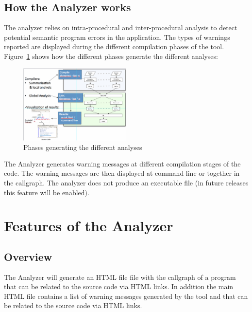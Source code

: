 \subsection{How the \openshmem Analyzer works}

The \openshmem analyzer relies on intra-procedural and inter-procedural
analysis to detect potential semantic program errors in the
application. The types of warnings reported are displayed during the
different compilation phases of the tool. Figure~\ref{fig:phases} shows
how the different phases generate the different analyses:

\begin{figure}[!h]
  \begin{center}
    \includegraphics[width=0.5\textwidth]{./image002}
    \caption{Phases generating the different analyses}
    \label{fig:phases}
  \end{center}
\end{figure}

The \openshmem Analyzer generates warning messages at different
compilation stages of the code. The warning messages are then
displayed at command line or together in the callgraph.  The \openshmem
analyzer does not produce an executable file (in future releases this
feature will be enabled).

\section{Features of the \openshmem Analyzer}
\label{chapter:features}

\subsection{Overview}

The \openshmem Analyzer will generate an HTML file file with the
callgraph of a program that can be related to the source code via HTML
links. In addition the main HTML file contains a list of warning
messages generated by the tool and that can be related to the source
code via HTML links.

